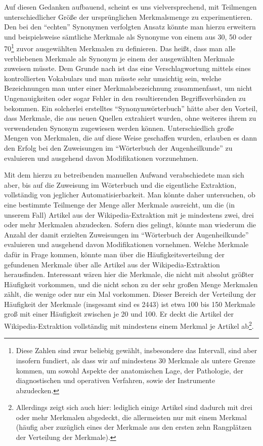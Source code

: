 \documentclass[pagesize,DIV=calc,12pt,final]{scrreprt}
\begin{document}
Auf diesen Gedanken aufbauend, scheint es uns vielversprechend, mit Teilmengen unterschiedlicher Größe der ursprünglichen Merkmalsmenge zu experimentieren.
Den bei den \enquote{echten} Synonymen verfolgten Ansatz könnte man hierzu erweitern und beispielsweise sämtliche Merkmale als Synonyme von einem aus 30, 50 oder 70\footnote{Diese Zahlen sind zwar beliebig gewählt, insbesondere das Intervall, sind aber insofern fundiert, als dass wir auf mindestens 30 Merkmale als untere Grenze kommen, um sowohl Aspekte der anatomischen Lage, der Pathologie, der diagnostischen und operativen Verfahren, sowie der Instrumente abzudecken.} zuvor ausgewählten Merkmalen zu definieren.
Das heißt, dass man alle verbliebenen Merkmale als Synonym je einem der ausgewählten Merkmale zuweisen müsste.
Dem Grunde nach ist das eine Verschlagwortung mittels eines kontrollierten Vokabulars und man müsste sehr umsichtig sein, welche Bezeichnungen man unter einer Merkmalsbezeichnung zusammenfasst, um nicht Ungenauigkeiten oder sogar Fehler in den resultierenden Begriffsverbänden zu bekommen.
Ein solcherlei erstelltes \enquote{Synonymwörterbuch} hätte aber den Vorteil, dass Merkmale, die aus neuen Quellen extrahiert wurden, ohne weiteres ihrem zu verwendenden Synonym zugewiesen werden können.
Unterschiedlich große Mengen von Merkmalen, die auf diese Weise geschaffen wurden, erlauben es dann den Erfolg bei den Zuweisungen im \enquote{Wörterbuch der Augenheilkunde} zu evaluieren und ausgehend davon Modifikationen vorzunehmen.

Mit dem hierzu zu betreibenden manuellen Aufwand verabschiedete man sich aber, bis auf die Zuweisung im Wörterbuch und die eigentliche Extraktion, vollständig von jeglicher Automatisierbarkeit.
Man könnte daher untersuchen, ob eine bestimmte Teilmenge der Menge aller Merkmale ausreicht, um die (in unserem Fall) Artikel aus der Wikipedia-Extraktion mit je mindestens zwei, drei oder mehr Merkmalen abzudecken.
Sofern dies gelingt, könnte man wiederum die Anzahl der damit erzielten Zuweisungen im \enquote{Wörterbuch der Augenheilkunde} evaluieren und ausgehend davon Modifikationen vornehmen.
Welche Merkmale dafür in Frage kommen, könnte man über die Häufigkeitsverteilung der gefundenen Merkmale über alle Artikel aus der Wikipedia-Extraktion herausfinden.
Interessant wären hier die Merkmale, die nicht mit absolut größter Häufigkeit vorkommen, und die nicht schon zu der sehr großen Menge Merkmalen zählt, die wenige oder nur ein Mal vorkommen.
Dieser Bereich der Verteilung der Häufigkeit der Merkmale (insgesamt sind es 2443) ist etwa 100 bis 150 Merkmale groß mit einer Häufigkeit zwischen je 20 und 100.
Er deckt die Artikel der Wikipedia-Extraktion vollständig mit mindestens einem Merkmal je Artikel ab\footnote{Allerdings zeigt sich auch hier: lediglich einige Artikel sind dadurch mit drei oder mehr Merkmalen abgedeckt, die allermeisten nur mit einem Merkmal (häufig aber zuzüglich eines der Merkmale aus den ersten zehn Rangplätzen der Verteilung der Merkmale).}.
\end{document}
